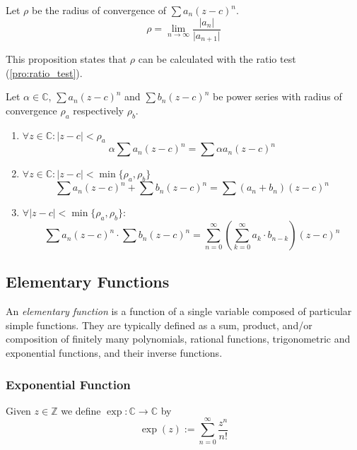 \begin{proposition}\label{pro:conv_rad_ratio_test}
   Let \(\rho\) be the radius of convergence of \(\sum a_n (z-c)^n\).
   \[\rho = \lim_{n \to \infty} \frac{\lvert a_n\rvert}{\lvert a_{n+1}\rvert}\]
\end{proposition}
\begin{remark}
   This proposition states that \(\rho\) can be calculated with the ratio test (\ref{pro:ratio_test}).
\end{remark}

\begin{theorem}
   Let \(\alpha \in \mathbb{C}\), \(\sum a_n (z - c)^n\) and \(\sum b_n (z-c)^n\) be power series with radius of convergence \(\rho_a\) respectively \(\rho_b\).
   \begin{enumerate}[label=\roman*, align=Center]
      \item \(\forall z \in \mathbb{C}: |z-c| < \rho_a\)
         \[\alpha \sum a_n (z - c)^n = \sum \alpha a_n (z - c)^n\]
      \item \(\forall z \in \mathbb{C}: |z-c| < \min\{\rho_a, \rho_b\}\)
         \[\sum a_n (z-c)^n + \sum b_n (z-c)^n = \sum (a_n + b_n)(z-c)^n\]
      \item \(\forall |z-c| < \min\{\rho_a, \rho_b\}:\)
         \[\sum a_n (z-c)^n \cdot \sum b_n (z-c)^n = \sum_{n=0}^\infty\left(\sum_{k=0}^\infty a_k \cdot b_{n-k}\right)(z-c)^n\]
   \end{enumerate}
\end{theorem}

\newpage

\subsection{Elementary Functions}
An \emph{elementary function} is a function of a single variable composed of particular simple functions.
They are typically defined as a sum, product, and/or composition of finitely many polynomials, rational functions, trigonometric and exponential functions, and their inverse functions.

\subsubsection{Exponential Function}
\begin{definition}
   Given \(z \in \mathbb{Z}\) we define \(\exp: \mathbb{C} \to \mathbb{C}\) by
   \[\exp(z) := \sum_{n = 0}^\infty \frac{z^n}{n!}\]
\end{definition}

